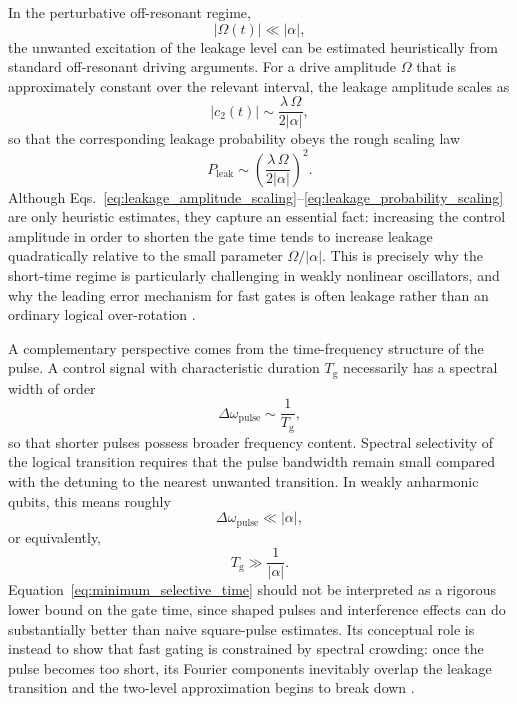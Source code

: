 In the perturbative off-resonant regime,
\begin{equation}
|\Omega(t)| \ll |\alpha|,
\label{eq:off_resonant_regime}
\end{equation}
the unwanted excitation of the leakage level can be estimated heuristically from standard off-resonant driving arguments. For a drive amplitude $\Omega$ that is approximately constant over the relevant interval, the leakage amplitude scales as
\begin{equation}
|c_{2}(t)|
\sim
\frac{\lambda\,\Omega}{2|\alpha|},
\label{eq:leakage_amplitude_scaling}
\end{equation}
so that the corresponding leakage probability obeys the rough scaling law
\begin{equation}
P_{\mathrm{leak}}
\sim
\left(\frac{\lambda\,\Omega}{2|\alpha|}\right)^{2}.
\label{eq:leakage_probability_scaling}
\end{equation}
Although Eqs.~\eqref{eq:leakage_amplitude_scaling}--\eqref{eq:leakage_probability_scaling} are only heuristic estimates, they capture an essential fact: increasing the control amplitude in order to shorten the gate time tends to increase leakage quadratically relative to the small parameter $\Omega/|\alpha|$. This is precisely why the short-time regime is particularly challenging in weakly nonlinear oscillators, and why the leading error mechanism for fast gates is often leakage rather than an ordinary logical over-rotation \cite{Motzoi2009,Gambetta2011}.

A complementary perspective comes from the time-frequency structure of the pulse. A control signal with characteristic duration $T_{\mathrm{g}}$ necessarily has a spectral width of order
\begin{equation}
\Delta \omega_{\mathrm{pulse}}
\sim
\frac{1}{T_{\mathrm{g}}},
\label{eq:time_frequency_width}
\end{equation}
so that shorter pulses possess broader frequency content. Spectral selectivity of the logical transition requires that the pulse bandwidth remain small compared with the detuning to the nearest unwanted transition. In weakly anharmonic qubits, this means roughly
\begin{equation}
\Delta \omega_{\mathrm{pulse}} \ll |\alpha|,
\label{eq:spectral_selectivity_condition}
\end{equation}
or equivalently,
\begin{equation}
T_{\mathrm{g}} \gg \frac{1}{|\alpha|}.
\label{eq:minimum_selective_time}
\end{equation}
Equation~\eqref{eq:minimum_selective_time} should not be interpreted as a rigorous lower bound on the gate time, since shaped pulses and interference effects can do substantially better than naive square-pulse estimates. Its conceptual role is instead to show that fast gating is constrained by spectral crowding: once the pulse becomes too short, its Fourier components inevitably overlap the leakage transition and the two-level approximation begins to break down \cite{Motzoi2009,Werninghaus2021}.

